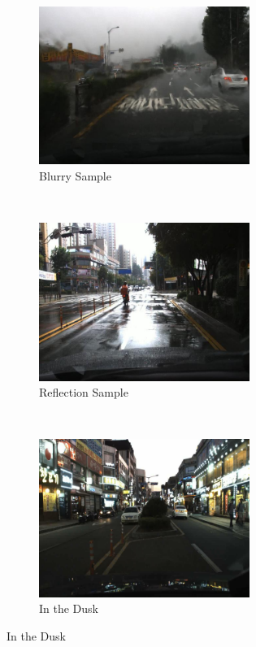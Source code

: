 \begin{spacing}{1.5}
\begin{figure}[th]
    \centering
    \begin{subfigure}[b]{0.49\textwidth}
        \centering
        \includegraphics[width=2.7in, fbox]{Chapter1/blurry.png}
        \caption{Blurry Sample}
        \label{fig:blurry} 
    \end{subfigure}%
    ~
    \begin{subfigure}[b]{0.49\textwidth}
        \centering
        \includegraphics[width=2.7in, fbox]{Chapter1/reflection.png}
        \caption{Reflection Sample}
        \label{fig:reflection} 
    \end{subfigure}
    \\
    \begin{subfigure}[b]{0.49\textwidth}
        \centering
        \includegraphics[width=2.7in, fbox]{Chapter1/dusk.png}
        \caption{In the Dusk}
        \label{fig:dusk} 
    \end{subfigure}%

\end{figure}
\end{spacing}
